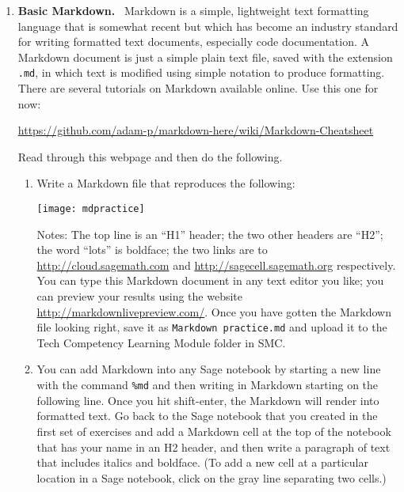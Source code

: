 \documentclass[11pt,letterpaper]{article}
\begin{document}
\begin{enumerate}
\item \textbf{Basic Markdown.} \ Markdown is a simple, lightweight text formatting language that is somewhat recent but which has become an industry standard for writing formatted text documents, especially code documentation. A Markdown document is just a simple plain text file, saved with the extension \verb=.md=, in which text is modified using simple notation to produce formatting. There are several tutorials on Markdown available online. Use this one for now: 
\begin{center}
	\url{https://github.com/adam-p/markdown-here/wiki/Markdown-Cheatsheet}
\end{center}
Read through this webpage and then do the following. 
	\begin{enumerate}
		\item Write a Markdown file that reproduces the following: 
		\begin{center}
			\texttt{[image: mdpractice]}
		\end{center}
	Notes: The top line is an ``H1'' header; the two other headers are ``H2''; the word ``lots'' is boldface; the two links are to \url{http://cloud.sagemath.com} and \url{http://sagecell.sagemath.org} respectively. You can type this Markdown document in any text editor you like; you can preview your results using the website \url{http://markdownlivepreview.com/}. Once you have gotten the Markdown file looking right, save it as \verb=Markdown practice.md= and upload it to the Tech Competency Learning Module folder in SMC.  
		\item You can add Markdown into any Sage notebook by starting a new line with the command \verb.%md. and then writing in Markdown starting on the following line. Once you hit shift-enter, the Markdown will render into formatted text. Go back to the Sage notebook that you created in the first set of exercises and add a Markdown cell at the top of the notebook that has your name in an H2 header, and then write a paragraph of text that includes italics and boldface. (To add a new cell at a particular location in a Sage notebook, click on the gray line separating two cells.)
	\end{enumerate}


\end{enumerate}
\end{document}

